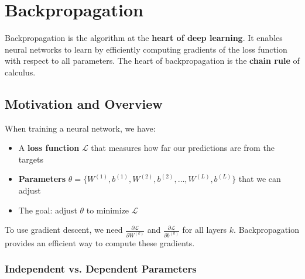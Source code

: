 
\chapter{Backpropagation}
\label{ch:backpropagation}

\begin{keyconcept}
Backpropagation is the algorithm at the \textbf{heart of deep learning}. It enables neural networks to learn by efficiently computing gradients of the loss function with respect to all parameters. The heart of backpropagation is the \textbf{chain rule} of calculus.
\end{keyconcept}

\section{Motivation and Overview}

When training a neural network, we have:
\begin{itemize}
    \item A \textbf{loss function} $\mathcal{L}$ that measures how far our predictions are from the targets
    \item \textbf{Parameters} $\theta = \{W^{(1)}, b^{(1)}, W^{(2)}, b^{(2)}, \ldots, W^{(L)}, b^{(L)}\}$ that we can adjust
    \item The goal: adjust $\theta$ to minimize $\mathcal{L}$
\end{itemize}

To use gradient descent, we need $\frac{\partial \mathcal{L}}{\partial W^{(k)}}$ and $\frac{\partial \mathcal{L}}{\partial b^{(k)}}$ for all layers $k$. Backpropagation provides an efficient way to compute these gradients.

\subsection{Independent vs. Dependent Parameters}

